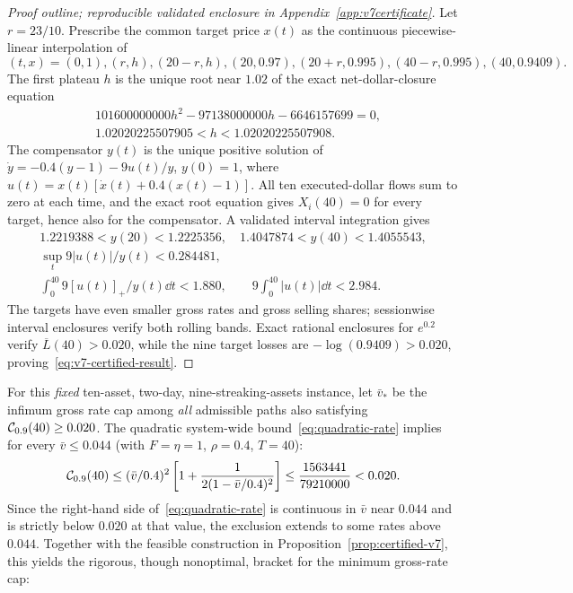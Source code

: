 \documentclass[review,hidelinks,onefignum,onetabnum]{siamonline250211}
\begin{document}
\begin{proof}[Proof outline; reproducible validated enclosure in Appendix~\ref{app:v7certificate}]
Let $r=23/10$. Prescribe the common target price $x(t)$ as the continuous piecewise-linear interpolation of
\begin{equation}\label{eq:v7-knots}
(t,x)=(0,1),(r,h),(20-r,h),(20,0.97),(20+r,0.995),(40-r,0.995),(40,0.9409).
\end{equation}
The first plateau $h$ is the unique root near $1.02$ of the exact net-dollar-closure equation
\begin{equation}\label{eq:v7-root}
\begin{aligned}
&101600000000h^2-97138000000h-6646157699=0,\\
&1.02020225507905<h<1.02020225507908.
\end{aligned}
\end{equation}
The compensator $y(t)$ is the unique positive solution of
$\dot y=-0.4(y-1)-9u(t)/y$, $y(0)=1$, where
$u(t)=x(t)[\dot x(t)+0.4(x(t)-1)]$.
All ten executed-dollar flows sum to zero at each time, and the exact root equation gives $X_i(40)=0$ for every target, hence also for the compensator. A validated interval integration gives
\begin{equation}\label{eq:v7-bounds}
\begin{gathered}
1.2219388<y(20)<1.2225356,\quad
1.4047874<y(40)<1.4055543,\\
\sup_t9|u(t)|/y(t)<0.284481,\\
\int_0^{40}9[u(t)]_+/y(t)\dd t<1.880,\qquad
9\int_0^{40}|u(t)|\dd t<2.984.
\end{gathered}
\end{equation}
The targets have even smaller gross rates and gross selling shares; sessionwise interval enclosures verify both rolling bands. Exact rational enclosures for $e^{0.2}$ verify $\overline L(40)>0.020$, while the nine target losses are $-\log(0.9409)>0.020$, proving~\eqref{eq:v7-certified-result}.
\end{proof}
For this \emph{fixed} ten-asset, two-day, nine-streaking-assets instance, let $\bar v_*$ be the infimum gross rate cap among \emph{all} admissible paths also satisfying $\mathcal{C}_{0.9}(40)\ge0.020$. The quadratic system-wide bound~\eqref{eq:quadratic-rate} implies for every $\bar v\le 0.044$ (with $F=\eta=1$, $\rho=0.4$, $T=40$):
\[
\mathcal{C}_{0.9}(40)\le (\bar v/0.4)^2
\left[1+\frac{1}{2(1-\bar v/0.4)^2}\right]
\le \frac{1563441}{79210000}<0.020.
\]
Since the right-hand side of~\eqref{eq:quadratic-rate} is continuous in $\bar v$ near $0.044$ and is strictly below $0.020$ at that value, the exclusion extends to some rates above $0.044$. Together with the feasible construction in Proposition~\ref{prop:certified-v7}, this yields the rigorous, though nonoptimal, bracket for the minimum gross-rate cap:
\end{document}
